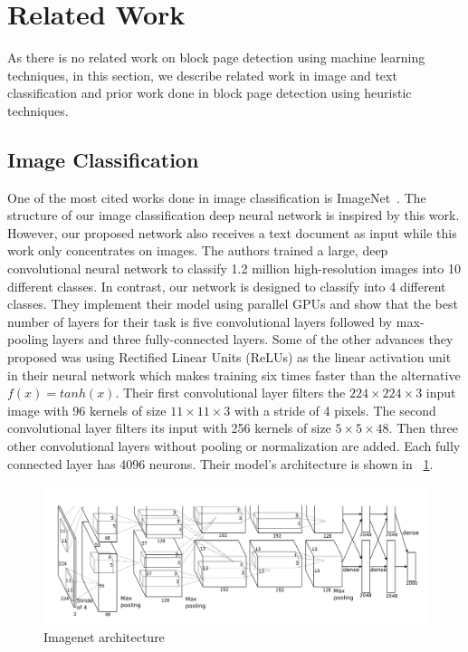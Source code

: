 \documentclass{article} %
\begin{document}
\section{Related Work}
As there is no related work on block page detection using machine learning techniques, in this section, we describe related work in image and text classification and prior work done in block page detection using heuristic techniques.

\subsection{Image Classification}
One of the most cited works done in image classification is ImageNet~\cite{imagehinton}. The structure of our image classification deep neural network is inspired by this work. However, our proposed network also receives a text document as input while this work only concentrates on images.
The authors trained a large, deep convolutional neural network to classify 1.2 million high-resolution images into 10 different classes. In contrast, our network is designed to classify into 4 different classes.
They implement their model using parallel GPUs and show that the best number of layers for their task is five convolutional layers followed by max-pooling layers and three fully-connected layers. Some of the other advances they proposed was using Rectified Linear Units (ReLUs) as the linear activation unit in their neural network which makes training six times faster than the alternative $f(x) = tanh(x)$.
Their first convolutional layer filters the $224 \times 224 \times 3$ input image with 96 kernels of size $11 \times 11 \times 3$ with a stride of 4 pixels. The second convolutional layer filters its input with 256 kernels of size $5\times5\times48$. Then three other convolutional layers without pooling or normalization are added. Each fully connected layer has 4096 neurons. Their model's architecture is shown in ~\ref{fig:imagenet}.
\begin{figure}
\centering
        \includegraphics[totalheight=5cm]{imagenet}
    \caption{Imagenet architecture \protect\cite{imagehinton}}
    \label{fig:imagenet}
\end{figure}
\end{document}
